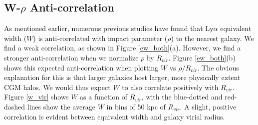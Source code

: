 \documentclass[iop]{emulateapj-rtx4}
\begin{document}


\subsection{W-$\rho$ Anti-correlation}
As mentioned earlier, numerous previous studies have found that Ly$\alpha$ equivalent width ($W$) is anti-correlated with impact parameter ($\rho$) to the nearest galaxy. We find a weak correlation, as shown in Figure \ref{ew_both}(a). However, we find a stronger anti-correlation when we normalize $\rho$ by $R_{vir}$. Figure \ref{ew_both}(b) shows this expected anti-correlation when plotting $W$ vs $\rho/R_{vir}$. The obvious explanation for this is that larger galaxies host larger, more physically extent CGM halos. We would thus expect $W$ to also correlate positively with $R_{vir}$. Figure \ref{w_vir} shows $W$ as a function of $R_{vir}$, with the blue-dotted and red-dashed lines show the average $W$ in bins of 50 kpc of $R_{vir}$. A slight, positive correlation is evident between equivalent width and galaxy virial radius.


\end{document}
